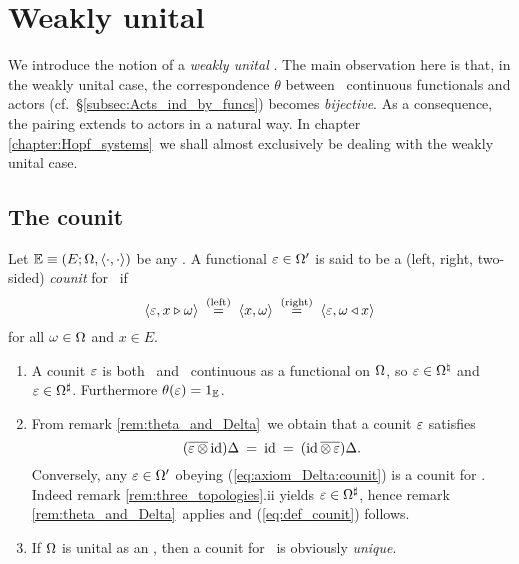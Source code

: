 
\section{Weakly unital \contexts}
\label{par:weakly_unital_contexts}


\begin{abs_chp} \rm
We introduce the notion of a {\em weakly unital\/} \context\@.
The main observation here is that, in the weakly unital case, the correspondence $\theta$
between \stricta\ continuous functionals and actors
(cf.\ \S \ref{subsec:Acts_ind_by_funcs}) becomes {\em bijective}\@.
As a consequence, the pairing extends to actors in a natural way.
In chapter \ref{chapter:Hopf_systems}\ we shall almost exclusively be dealing
with the weakly unital case.
\end{abs_chp}


\subsection{The counit}

\begin{defn} \label{def:counit}
  Let $\mathbb{E} \equiv (E; \Omega, \langle\cdot, \cdot\rangle)$ be any \context\@. A functional $\varepsilon \in \Omega'$ is said to be a
  (left, right, two-sided) {\em counit\/} for \EE\ if
  \begin{equation} \label{eq:def_counit}
     \langle \varepsilon,x\triangleright\omega \rangle    \;
     \stackrel{\rm (left)}{=}  \;  \langle x,\omega \rangle  \;  \stackrel{\rm (right)}{=}  \;
     \langle \varepsilon,\omega \triangleleft x \rangle
  \end{equation}
  for all $\omega \in \Omega$ and $x\in E$.
\end{defn}

\begin{rems} \label{rem:def_of_counit} \rm
  \begin{enumerate}
  \item
    A counit $\varepsilon$ is both \strictm\ and \stricta\ continuous as a functional on $\Omega$,
    so $\varepsilon \in \Omega^\natural$ and $\varepsilon \in \Omega^\sharp$\@. Furthermore $\theta(\varepsilon)=1_{\mathbb{E}}$.
  \item
   From remark \ref{rem:theta_and_Delta}\ we obtain that a counit $\varepsilon$ satisfies
    \begin{equation} \label{eq:axiom_Delta:counit}
        (\overline{\varepsilon \,\otimes}\, \mbox{\rm id})\Delta
          \:=\: \mbox{\rm id} \:=\:  (\mbox{\rm id}\, \overline{\otimes \,\varepsilon})\Delta.
    \end{equation}
   Conversely, any $\varepsilon\in\Omega'$ obeying (\ref{eq:axiom_Delta:counit})
   is a counit for \EE\@. Indeed remark \ref{rem:three_topologies}.ii  yields
   $\varepsilon \in \Omega^\sharp$, hence remark \ref{rem:theta_and_Delta}\ applies
   and (\ref{eq:def_counit}) follows.
  \item
    If $\Omega$ is unital as an \Ebimod, then a counit for \EE\ is obviously {\em unique}\@.
  \end{enumerate}
\end{rems}



